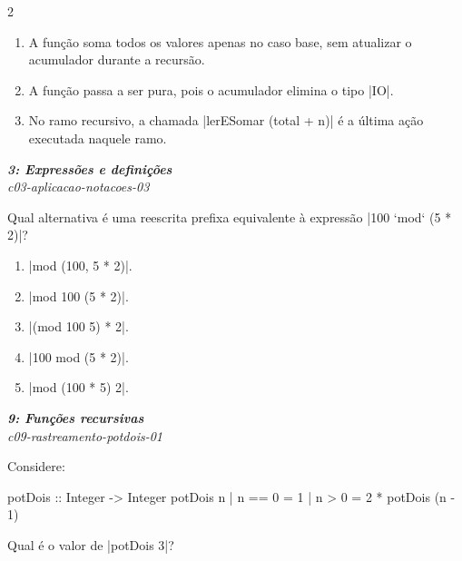 \documentclass[a4paper,10pt,brazil]{article}
\begin{document}
\begin{multicols}{2}
\begin{enumerate}
  \item A função soma todos os valores apenas no caso base, sem atualizar o acumulador durante a recursão.

  \item A função passa a ser pura, pois o acumulador elimina o tipo \haskellinline|IO|.

  \item No ramo recursivo, a chamada \haskellinline|lerESomar (total + n)| é a última ação executada naquele ramo.


\end{enumerate}

\begin{flushright}
  \footnotesize
  \textit{\textbf{3: Expressões e definições}}\\
  \textit{c03-aplicacao-notacoes-03}\\

\end{flushright}
Qual alternativa é uma reescrita prefixa equivalente à expressão \haskellinline|100 `mod` (5 * 2)|?

\begin{enumerate}
  \item \haskellinline|mod (100, 5 * 2)|.

  \item \haskellinline|mod 100 (5 * 2)|.

  \item \haskellinline|(mod 100 5) * 2|.

  \item \haskellinline|100 mod (5 * 2)|.

  \item \haskellinline|mod (100 * 5) 2|.


\end{enumerate}

\begin{flushright}
  \footnotesize
  \textit{\textbf{9: Funções recursivas}}\\
  \textit{c09-rastreamento-potdois-01}\\

\end{flushright}
Considere:
\begin{haskellcode}
potDois :: Integer -> Integer
potDois n
  | n == 0 = 1
  | n > 0  = 2 * potDois (n - 1)
\end{haskellcode}
Qual é o valor de \haskellinline|potDois 3|?


\end{multicols}
\end{document}
